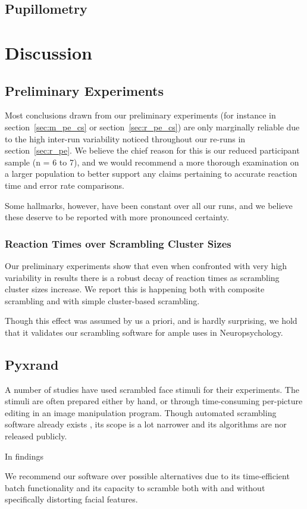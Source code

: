     \section{Pupillometry}\label{sec:r_p}
\chapter{Discussion}
    \section{Preliminary Experiments}\label{sec:d_pe}
	Most conclusions drawn from our preliminary experiments (for instance in section~\ref{sec:m_pe_cs} or section~\ref{sec:r_pe_cs}) are only marginally reliable due to the high inter-run variability noticed throughout our re-runs in section~\ref{sec:r_pe}.
	We believe the chief reason for this is our reduced participant sample (n = 6 to 7), and we would recommend a more thorough examination on a larger population to better support any claims pertaining to accurate reaction time and error rate comparisons.
	
	Some hallmarks, however, have been constant over all our runs, and we believe these deserve to be reported with more pronounced certainty.
	\subsection{Reaction Times over Scrambling Cluster Sizes}
	    Our preliminary experiments show that even when confronted with very high variability in results there is a robust decay of reaction times as scrambling cluster sizes increase.
	    We report this is happening both with composite scrambling and with simple cluster-based scrambling.
	    
	    Though this effect was assumed by us a priori, and is hardly surprising, we hold that it validates our scrambling software for ample uses in Neuropsychology.
    \section{Pyxrand}
    A number of studies\cite{Rakover2013} have used scrambled face stimuli for their experiments.
    The stimuli are often prepared either by hand, or through time-consuming per-picture editing in an image manipulation program.
    Though automated scrambling software already exists \cite{Conway2008}, its scope is a lot narrower and its algorithms are nor released publicly.
    
    In findings 
    
    We recommend our software over possible alternatives due to its time-efficient batch functionality and its capacity to scramble both with and without specifically distorting facial features.



